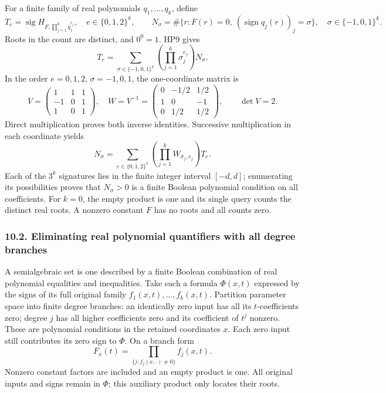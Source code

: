 \documentclass[
  11pt,
]{article}
\begin{document}
For a finite family of real polynomials \(q_1,\ldots,q_k\), define \[
T_e=\operatorname{sig}H_{F,\prod_{j=1}^{k}q_j^{e_j}},
\quad e\in\{0,1,2\}^k,\qquad
N_\sigma=\#\{r:F(r)=0,\ (\operatorname{sign}q_j(r))_j=\sigma\},
\quad \sigma\in\{-1,0,1\}^k.
\tag{HP12}
\] Roots in the count are distinct, and \(0^0=1\). HP9 gives \[
T_e=\sum_{\sigma\in\{-1,0,1\}^k}
\left(\prod_{j=1}^{k}\sigma_j^{e_j}\right)N_\sigma.
\tag{HP13}
\] In the order \(e=0,1,2\), \(\sigma=-1,0,1\), the one-coordinate
matrix is \[
V=\begin{pmatrix}1&1&1\\-1&0&1\\1&0&1\end{pmatrix},
\quad W=V^{-1}=
\begin{pmatrix}0&-1/2&1/2\\1&0&-1\\0&1/2&1/2\end{pmatrix},
\qquad \det V=2.
\tag{HP14}
\] Direct multiplication proves both inverse identities. Successive
multiplication in each coordinate yields \[
N_\sigma=\sum_{e\in\{0,1,2\}^k}
\left(\prod_{j=1}^{k}W_{\sigma_j,e_j}\right)T_e.
\tag{HP15}
\] Each of the \(3^k\) signatures lies in the finite integer interval
\([-d,d]\); enumerating its possibilities proves that \(N_\sigma>0\) is
a finite Boolean polynomial condition on all coefficients. For \(k=0\),
the empty product is one and its single query counts the distinct real
roots. A nonzero constant \(F\) has no roots and all counts zero.

\subsubsection{10.2. Eliminating real polynomial quantifiers with all
degree
branches}\label{eliminating-real-polynomial-quantifiers-with-all-degree-branches}

A semialgebraic set is one described by a finite Boolean combination of
real polynomial equalities and inequalities. Take such a formula
\(\Phi(x,t)\) expressed by the signs of its full original family
\(f_1(x,t),\ldots,f_k(x,t)\). Partition parameter space into finite
degree branches: an identically zero input has all its
\(t\)-coefficients zero; degree \(j\) has all higher coefficients zero
and its coefficient of \(t^j\) nonzero. These are polynomial conditions
in the retained coordinates \(x\). Each zero input still contributes its
zero sign to \(\Phi\). On a branch form \[
F_x(t)=\prod_{\{j:f_j(x,\cdot)\ne0\}}f_j(x,t).
\tag{HP16}
\] Nonzero constant factors are included and an empty product is one.
All original inputs and signs remain in \(\Phi\); this auxiliary product
only locates their roots.
\end{document}
